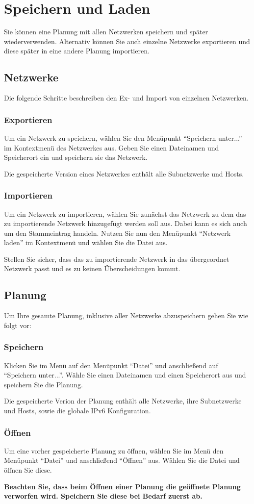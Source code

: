 \section{Speichern und Laden}
Sie können eine Planung mit allen Netzwerken speichern und später wiederverwenden.
Alternativ können Sie auch einzelne Netzwerke exportieren und diese später in eine
andere Planung importieren.

\subsection{Netzwerke}
Die folgende Schritte beschreiben den Ex- und Import von einzelnen Netzwerken.

\subsubsection{Exportieren}
Um ein Netzwerk zu speichern, wählen Sie den Menüpunkt "`Speichern unter..."' im
Kontextmenü des Netzwerkes aus. Geben Sie einen Dateinamen und Speicherort ein und
speichern sie das Netzwerk.

Die gespeicherte Version eines Netzwerkes enthält alle Subnetzwerke und Hosts.

\subsubsection{Importieren}
Um ein Netzwerk zu importieren, wählen Sie zunächst das Netzwerk zu dem das zu
importierende Netzwerk hinzugefügt werden soll aus. Dabei kann es sich auch um
den Stammeintrag handeln. Nutzen Sie nun den Menüpunkt "`Netzwerk laden"' im
Kontextmenü und wählen Sie die Datei aus.

Stellen Sie sicher, dass das zu importierende Netzwerk in das übergeordnet
Netzwerk passt und es zu keinen Überscheidungen kommt.

\subsection{Planung}
Um Ihre gesamte Planung, inklusive aller Netzwerke abzuspeichern gehen Sie wie folgt
vor:

\subsubsection{Speichern}
Klicken Sie im Menü auf den Menüpunkt "`Datei"' und anschließend auf
"`Speichern unter..."'. Wähle Sie einen Dateinamen und einen Speicherort aus und
speichern Sie die Planung.

Die gespeicherte Verion der Planung enthält alle Netzwerke, ihre
Subnetzwerke und Hosts, sowie die globale IPv6 Konfiguration.

\subsubsection{Öffnen}
Um eine vorher gespeicherte Planung zu öffnen, wählen Sie im Menü den Menüpunkt
"`Datei"' und anschließend "`Öffnen"' aus. Wählen Sie die Datei und öffnen Sie
diese.

\textbf{Beachten Sie, dass beim Öffnen einer Planung die geöffnete Planung verworfen wird.
Speichern Sie diese bei Bedarf zuerst ab.}